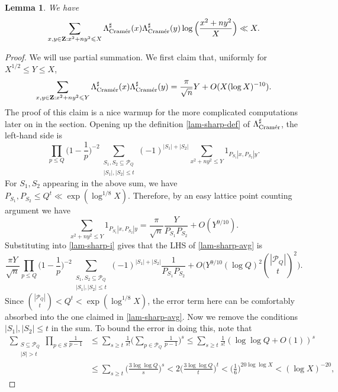 \documentclass[11pt,reqno]{amsart}
\numberwithin{equation}{section}
\newtheorem{lemma}[theorem]{Lemma}
\theoremstyle{definition}
\theoremstyle{remark}
\newcommand{\mc}{\mathcal}
\renewcommand{\le}{\leqslant}
\renewcommand{\ge}{\geqslant}
\newcommand\Z{\mathbf{Z}}
\newcommand\cramer{{\textnormal{Cram\'er}}}
\begin{document}
\begin{lemma}\label{partial-sum}
We have
\[ \sum_{x, y \in \Z: x^2 + ny^2 \le X }\Lambda_{\cramer}^{\sharp}(x) \Lambda_{\cramer}^{\sharp}(y) \log \Big(\frac{x^2 + ny^2}{X}\Big) \ll X. \]
\end{lemma}
\begin{proof}
We will use partial summation. We first claim that, uniformly for $X^{1/2} \le Y \le X$,
\begin{equation}\label{lam-sharp-avg} \sum_{x, y \in \Z: x^2 + ny^2 \le Y} \Lambda_{\cramer}^{\sharp}(x) \Lambda_{\cramer}^{\sharp}(y) = \frac{\pi}{\sqrt{n}} Y + O(X (\log X)^{-10}).\end{equation}
The proof of this claim is a nice warmup for the more complicated computations later on in the section. Opening up the definition \cref{lam-sharp-def} of $\Lambda_{\cramer}^{\sharp}$, the left-hand side is
\begin{equation}\label{lam-sharp-i}
\prod_{p \le Q} \Big(1 - \frac{1}{p}\Big)^{-2} \sum_{\substack{S_1, S_2 \subseteq \mc{P}_Q \\ |S_1|, |S_2| \le t}} (-1)^{|S_1| + |S_2|} \sum_{x^2 + ny^2 \le Y} 1_{P_{S_1} | x, P_{S_2} | y}.
\end{equation}
For $S_1, S_2$ appearing in the above sum, we have $P_{S_1}, P_{S_2} \le Q^t \ll \exp(\log^{1/8} X)$. Therefore, by an easy lattice point counting argument we have
\[ \sum_{x^2 + ny^2 \le Y} 1_{P_{S_1} | x, P_{S_2} | y} = \frac{\pi}{\sqrt{n}} \frac{Y}{P_{S_1} P_{S_2}} + O(Y^{9/10}).\]
Substituting into \cref{lam-sharp-i} gives that the LHS of \cref{lam-sharp-avg} is
\begin{equation}\label{interm}\frac{\pi Y}{\sqrt{n}} \prod_{p \le Q} \Big(1 - \frac{1}{p}\Big)^{-2} \sum_{\substack{S_1, S_2 \subseteq \mc{P}_Q \\ |S_1|, |S_2| \le t}} (-1)^{|S_1| + |S_2|} \frac{1}{P_{S_1} P_{S_2}} + O\bigg(Y^{9/10}(\log Q)^2 \binom{|\mc{P}_Q|}{t}^2\bigg).\end{equation}
Since $\binom{|\mc{P}_Q|}{t} < Q^t < \exp(\log^{1/8} X)$, the error term here can be comfortably absorbed into the one claimed in \cref{lam-sharp-avg}. Now we remove the conditions $|S_1|, |S_2| \le t$ in the sum. To bound the error in doing this, note that
\begin{align}\nonumber
\sum_{\substack{S \subseteq \mc{P}_Q \\ |S| > t}} \prod_{p \in S}\frac{1}{p-1} & \le \sum_{s \ge t} \frac{1}{s!} \Big( \sum_{p \in \mc{P}_Q} \frac{1}{p-1}\Big)^s   \le \sum_{s \ge t} \frac{1}{s!} (\log \log Q + O(1))^s \\ & \le \sum_{s \ge t} \Big( \frac{3 \log \log Q}{s} \Big)^s < 2 \Big( \frac{3 \log \log Q}{t}\Big)^t < \Big(\frac{1}{6}\Big)^{20 \log \log X} < (\log X)^{-20},\label{large-t-bd} 

\end{align}
\end{proof}
\end{document}
